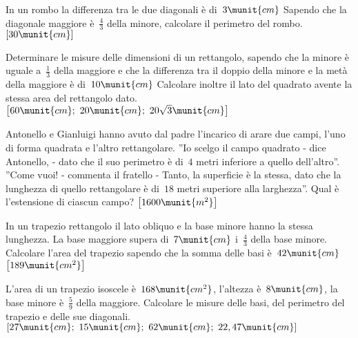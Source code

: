 \begin{htmulticols}{2}
\begin{esercizio}[*]
\label{ese:14.96}
In un rombo la differenza tra le due diagonali è di~\(3\munit{cm}\) Sapendo che la 
diagonale maggiore è~\(\frac{4}{3}\) della minore, calcolare il perimetro del 
rombo. \hfill \(\left[30\munit{cm}\right]\)
\end{esercizio}

\begin{esercizio}[*]
\label{ese:14.97}
Determinare le misure delle dimensioni di un rettangolo, sapendo che la minore è 
uguale a~\(\frac{1}{3}\) della maggiore e che la differenza tra il doppio della 
minore e la metà della maggiore è di~\(10\munit{cm}\) Calcolare inoltre il lato del 
quadrato avente la stessa area del rettangolo dato. 
\hfill \(\left[60\munit{cm};~20\munit{cm};~20\sqrt{3}\munit{cm}\right]\)
\end{esercizio}

\begin{esercizio}[*]
\label{ese:14.98}
Antonello e Gianluigi hanno avuto dal padre l'incarico di arare due campi, l'uno 
di forma quadrata e l'altro rettangolare. ''Io scelgo il campo quadrato - dice 
Antonello, - dato che il suo perimetro è di~\(4\) metri inferiore a quello 
dell'altro''. ''Come vuoi! - commenta il fratello - Tanto, la superficie è la 
stessa, dato che la lunghezza di quello rettangolare è di~\(18\) metri superiore 
alla larghezza''. Qual è l'estensione di ciascun campo?
 \hfill \(\left[1600\munit{m^2}\right]\)
\end{esercizio}

\begin{esercizio}[*]
\label{ese:14.99}
In un trapezio rettangolo il lato obliquo e la base minore hanno la stessa 
lunghezza. La base maggiore supera di~\(7\munit{cm}\) i~\(\frac{4}{3}\) della base 
minore. Calcolare l'area del trapezio sapendo che la somma delle basi 
è~\(42\munit{cm}\) \hfill \(\left[189\munit{cm^2}\right]\)
\end{esercizio}

\begin{esercizio}[*]
\label{ese:14.100}
L'area di un trapezio isoscele è~\(168\munit{cm^2}\), l'altezza è~\(8\munit{cm}\), la 
base minore è~\(\frac{5}{9}\) della maggiore. Calcolare le misure delle basi, del 
perimetro del trapezio e delle sue diagonali. 
\hfill \(\left[27\munit{cm};~15\munit{cm};~62\munit{cm};~22,47\munit{cm}\right]\)
\end{esercizio}


\end{htmulticols}
